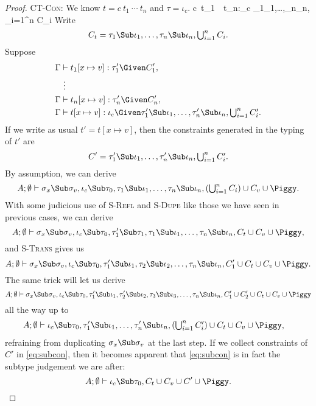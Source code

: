 \documentclass{amsart}
\theoremstyle{definition}
\begin{document}
\begin{proof}
\Case\textsc{CT-Con}: We know $t=c~t_1~\cdots~t_n$
and $\tau=\iota_c$.
%
{\Gamma\vdash c~t_1~\cdots~t_n:\iota_c\Given
\tau_1\Sub\iota_1,\ldots,\tau_n\Sub\iota_n,
{\textstyle\bigcup_{i=1}^n C_i}
}
%
Write
\[
C_t=\tau_1\Sub\iota_1,\ldots,\tau_n\Sub\iota_n,
{\textstyle\bigcup_{i=1}^n C_i}.
\]
Suppose
\begin{align*}
\Gamma&\vdash t_1[x\mapsto v]:\tau_1'\Given C_1',\\
&~\vdots\\
\Gamma&\vdash t_n[x\mapsto v]:\tau_n'\Given C_n',\\
\Gamma&\vdash t[x\mapsto v]:\iota_c\Given
\tau_1'\Sub\iota_1,\ldots,\tau_n'\Sub\iota_n,
{\textstyle\bigcup_{i=1}^n C_i'}.
\end{align*}
If we write as usual $t'=t[x\mapsto v]$, then the constraints
generated in the typing of $t'$ are
\[
C'=\tau_1'\Sub\iota_1,\ldots,\tau_n'\Sub\iota_n,
{\textstyle\bigcup_{i=1}^n C_i'}.
\]
By assumption, we can derive
\[
A;\emptyset\vdash \sigma_x\Sub\sigma_v,\iota_c\Sub\tau_0,
\tau_1\Sub\iota_1,\ldots,\tau_n\Sub\iota_n,
({\textstyle\bigcup_{i=1}^n C_i})
\cup C_v\cup\Piggy.
\]
With some judicious use of \textsc{S-Refl} and \textsc{S-Dupe}
like those we have seen in previous cases, we can derive
\[
A;\emptyset\vdash \sigma_x\Sub\sigma_v,\iota_c\Sub\tau_0,
\tau_1'\Sub\tau_1,
\tau_1\Sub\iota_1,\ldots,\tau_n\Sub\iota_n,
C_t\cup C_v\cup\Piggy,
\]
and \textsc{S-Trans} gives us
\[
A;\emptyset\vdash \sigma_x\Sub\sigma_v,\iota_c\Sub\tau_0,
\tau_1'\Sub\iota_1,
\tau_2\Sub\iota_2,\ldots,\tau_n\Sub\iota_n,
C_1'\cup
C_t\cup C_v\cup
\Piggy.
\]
The same trick will let us derive
\[
A;\emptyset\vdash \sigma_x\Sub\sigma_v,\iota_c\Sub\tau_0,
\tau_1'\Sub\iota_1,
\tau_2'\Sub\iota_2,
\tau_3\Sub\iota_3,
\ldots,\tau_n\Sub\iota_n,
C_1'\cup C_2'\cup
C_t\cup C_v\cup\Piggy
\]
all the way up to
\begin{align}
A;\emptyset&\vdash \iota_c\Sub\tau_0,
\tau_1'\Sub\iota_1,\ldots,\tau_n'\Sub\iota_n,
({\textstyle\bigcup_{i=1}^nC_i'})\cup
C_t\cup C_v\cup\Piggy,
\label{eq:subcon}
\end{align}
refraining from duplicating $\sigma_x\Sub\sigma_v$ at the last
step. If we collect constraints of $C'$ in \eqref{eq:subcon},
then it becomes apparent that \eqref{eq:subcon} is in fact the
subtype judgement we are after:
\[
A;\emptyset\vdash \iota_c\Sub\tau_0,
C_t\cup C_v\cup C'\cup\Piggy.
\]
\end{proof}
\end{document}
